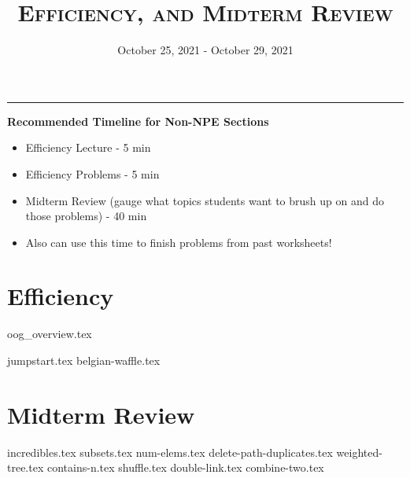 \documentclass{exam}
\title{\textsc{Efficiency, and Midterm Review}}
\date{October 25, 2021 - October 29, 2021}
\begin{document}
\maketitle
\rule{\textwidth}{0.15em}
\fontsize{12}{15}\selectfont

\begin{guide}
    \textbf{Recommended Timeline for Non-NPE Sections}
    \begin{itemize}
        \item Efficiency Lecture - 5 min
        \item Efficiency Problems - 5 min
        \item Midterm Review (gauge what topics students want to brush up on and do those problems) - 40 min
        \item Also can use this time to finish problems from past worksheets!
    \end{itemize}
\end{guide}

\section{Efficiency}
{oog_overview.tex}
\begin{questions}
    {jumpstart.tex}
    {belgian-waffle.tex}
\end{questions}

\newpage
\section{Midterm Review}
\begin{questions}
    {incredibles.tex}
    {subsets.tex}
    \newpage
    {num-elems.tex}
    \newpage
    {delete-path-duplicates.tex}
    {weighted-tree.tex}
    {contains-n.tex}
    {shuffle.tex}
    {double-link.tex}
    {combine-two.tex}
\end{questions}
\end{document}
